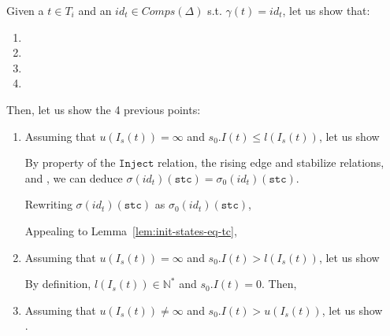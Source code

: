 \documentclass[dvipsnames,12pt]{article}
\begin{document}
\begin{niproof}
  Given a $t\in{}T_i$ and an $id_t\in{}Comps(\Delta)$
  s.t. $\gamma(t)=id_t$, let us show that:
  \begin{enumerate}
  \item {}
  \item {}
  \item {}
  \item {}
  \end{enumerate}

  \exT{}

  Then, let us show the 4 previous points:
  
  \begin{enumerate}
  \item Assuming that $u(I_s(t))=\infty$ and
    $s_0.I(t)\le{}l(I_s(t))$, let us show\\
    
    By property of the $\mathtt{Inject}$ relation, the
    \hvhdl{} rising edge and stabilize relations, and \InCsCompT{}, we
    can deduce $\sigma(id_t)(\texttt{stc})=\sigma_0(id_t)(\texttt{stc})$.
    
    Rewriting $\sigma(id_t)(\texttt{stc})$ as $\sigma_0(id_t)(\texttt{stc})$,

    Appealing to Lemma~\ref{lem:init-states-eq-tc},
  
  \item Assuming that $u(I_s(t))=\infty$ and
    ${}s_0.I(t)>{}l(I_s(t))$, let us show\\

    By definition, $l(I_s(t))\in\mathbb{N}^{*}$ and
    $s_0.I(t)=0$. Then, 
  \item Assuming that $u(I_s(t))\neq\infty$ and
    $s_0.I(t)>{}u(I_s(t))$, let us show\\
    .


\end{enumerate}
\end{niproof}
\end{document}
